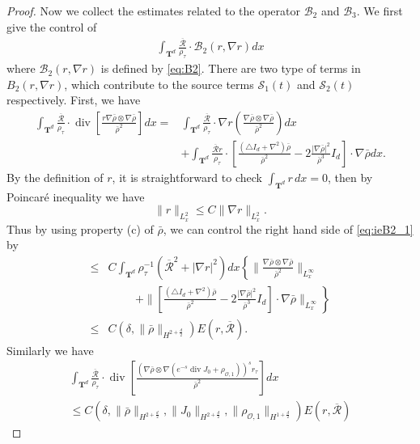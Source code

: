 \documentclass[english]{amsart}
\theoremstyle{plain}
\theoremstyle{definition}
\theoremstyle{remark}
\theoremstyle{plain}
\theoremstyle{plain}
\theoremstyle{plain}
\def\T{{\mathbf T}}%
\DeclareMathOperator{\diver}{div}
\numberwithin{equation}{section}
\begin{document}
\begin{proof}
Now we collect the estimates related to the operator $\mathcal{B}_2$ and $\mathcal{B}_3$. We first give the control of
\begin{align*}
\int_{\T^d} \frac{\overline{\mathcal{R}}}{\rho_\tau}\cdot\mathcal{B}_2(r,\nabla r)dx
\end{align*}
where $\mathcal{B}_2(r,\nabla r)$ is defined by \eqref{eq:B2}. There are two type of terms in ${B}_2(r,\nabla r)$, which contribute to the source terms $\mathcal{S}_1(t)$ and $\mathcal{S}_2(t)$ respectively. First, we have
\begin{equation}\label{eq:ieB2_1}
\begin{aligned}
\int_{\T^d} \frac{\overline{\mathcal{R}}}{\rho_\tau}\cdot\diver\left[\frac{r\nabla \bar\rho\otimes\nabla \bar\rho }{\bar\rho^2}\right]dx=&\int_{\T^d} \frac{\overline{\mathcal{R}}}{\rho_\tau}\cdot\nabla r\left(\frac{\nabla \bar\rho\otimes\nabla \bar\rho }{\bar\rho^2}\right)dx\\
&+\int_{\T^d} \frac{\overline{\mathcal{R}}r}{\rho_\tau}\cdot\left[\frac{(\triangle I_d+\nabla^2) \bar\rho }{\bar\rho^2}-2\frac{|\nabla\bar\rho|^2}{\bar\rho^3}I_d\right]\cdot\nabla\bar\rho dx.
\end{aligned}
\end{equation}
By the definition of $r$, it is straightforward to check $\int_{\T^d} r\,dx=0$, then by Poincar\'e inequality we have
\[
\|r\|_{L^2_x}\leq C\|\nabla r\|_{L^2_x}.
\]
Thus by using property (c) of $\bar\rho$, we can control the right hand side of \eqref{eq:ieB2_1} by
\begin{align*}
\leq & C\int_{\T^d}\rho_\tau^{-1}(\overline{\mathcal{R}}^2+|\nabla r|^2)dx\left\{\|\frac{\nabla \bar\rho\otimes\nabla \bar\rho }{\bar\rho^2}\|_{L^\infty_x}\right.\\
&\hspace{1cm}\left.+\|\left[\frac{(\triangle I_d+\nabla^2) \bar\rho }{\bar\rho^2}-2\frac{|\nabla\bar\rho|^2}{\bar\rho^3}I_d\right]\cdot\nabla\bar\rho\|_{L^\infty_x}\right\}\\
\leq &  C(\delta,\|\bar\rho\|_{H^{2+\frac{d}{2}}}) E(r,\overline{\mathcal{R}}).
\end{align*}
Similarly we have
\begin{align*}
\int_{\T^d} \frac{\overline{\mathcal{R}}}{\rho_\tau}\cdot\diver\left[\frac{(\nabla \bar\rho\otimes\nabla(e^{-s}\diver J_0+\rho_{\mathcal{O},1}))^sr_\tau}{\bar\rho^2}\right]dx\\
\leq C(\delta,\|\bar\rho\|_{H^{2+\frac{d}{2}}},\|J_0\|_{H^{2+\frac{d}{2}}},\|\rho_{\mathcal{O},1}\|_{H^{1+\frac{d}{2}}})E(r,\overline{\mathcal{R}})

\end{align*}
\end{proof}
\end{document}
